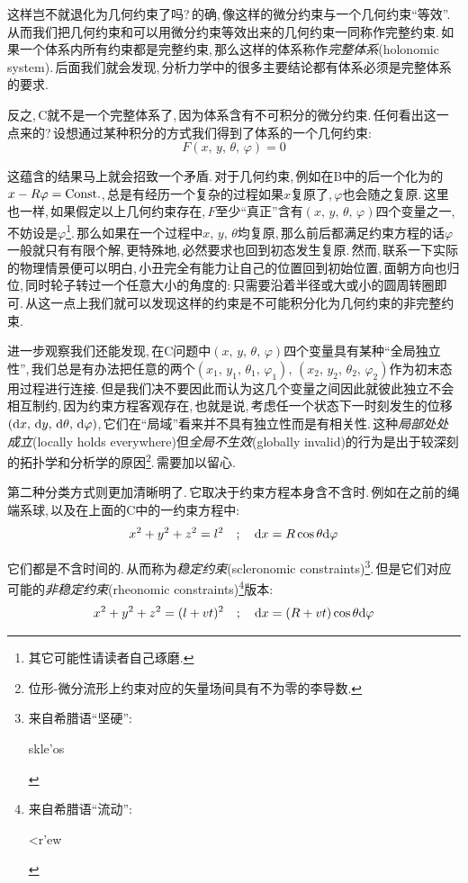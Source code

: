 这样岂不就退化为几何约束了吗?\,的确,\,像这样的微分约束与一个几何约束``等效''.\,从而我们把几何约束和可以用微分约束等效出来的几何约束一同称作完整约束.\,如果一个体系内所有约束都是完整约束,\,那么这样的体系称作\emph{完整体系}(holonomic system).\,后面我们就会发现,\,分析力学中的很多主要结论都有体系必须是完整体系的要求.

反之,\,C就不是一个完整体系了,\,因为体系含有不可积分的微分约束.\,任何看出这一点来的?\,设想通过某种积分的方式我们得到了体系的一个几何约束:
\[F(x,\,y,\,\theta,\,\varphi)=0\]

这蕴含的结果马上就会招致一个矛盾.\,对于几何约束,\,例如在B中的后一个化为的$x-R\varphi={\rm Const.}$,\,总是有经历一个复杂的过程如果$x$复原了,\,$\varphi$也会随之复原.\,这里也一样,\,如果假定以上几何约束存在,\,$F$至少``真正''含有$(x,\,y,\,\theta,\,\varphi)$四个变量之一,\,不妨设是$\varphi$\footnote{其它可能性请读者自己琢磨.}.\,那么如果在一个过程中$x,\,y,\,\theta$均复原,\,那么前后都满足约束方程的话$\varphi$一般就只有有限个解,\,更特殊地,\,必然要求也回到初态发生复原.\,然而,\,联系一下实际的物理情景便可以明白,\,小丑完全有能力让自己的位置回到初始位置,\,面朝方向也归位,\,同时轮子转过一个任意大小的角度的:\,只需要沿着半径或大或小的圆周转圈即可.\,从这一点上我们就可以发现这样的约束是不可能积分化为几何约束的非完整约束.

进一步观察我们还能发现,\,在C问题中$(x,\,y,\,\theta,\,\varphi)$四个变量具有某种``全局独立性'',\,我们总是有办法把任意的两个$(x_1,\,y_1,\,\theta_1,\,\varphi_1),\,(x_2,\,y_2,\,\theta_2,\,\varphi_2)$作为初末态用过程进行连接.\,但是我们决不要因此而认为这几个变量之间因此就彼此独立不会相互制约,\,因为约束方程客观存在,\,也就是说,\,考虑任一个状态下一时刻发生的位移$(\textrm{d} x,\,\textrm{d} y,\,\textrm{d} \theta,\,\textrm{d} \varphi)$,\,它们在``局域''看来并不具有独立性而是有相关性.\,这种\emph{局部处处成立}(locally holds everywhere)但\emph{全局不生效}(globally invalid)的行为是出于较深刻的拓扑学和分析学的原因\footnote{位形-微分流形上约束对应的矢量场间具有不为零的李导数.}.\,需要加以留心.

第二种分类方式则更加清晰明了.\,它取决于约束方程本身含不含时.\,例如在之前的绳端系球,\,以及在上面的C中的一约束方程中:
\[x^2+y^2+z^2=l^2 \quad;\quad \textrm{d} x=R\cos\theta\textrm{d} \varphi\]

它们都是不含时间的.\,从而称为\emph{稳定约束}(scleronomic constraints)\footnote{来自希腊语``坚硬'':  \begin{greek} skle'os\end{greek}}.\,但是它们对应可能的\emph{非稳定约束}(rheonomic constraints)\footnote{来自希腊语``流动'':  \begin{greek} <r'ew\end{greek}}版本:
\[x^2+y^2+z^2=(l+vt)^2 \quad;\quad \textrm{d} x=(R+vt)\cos\theta\textrm{d} \varphi\]

